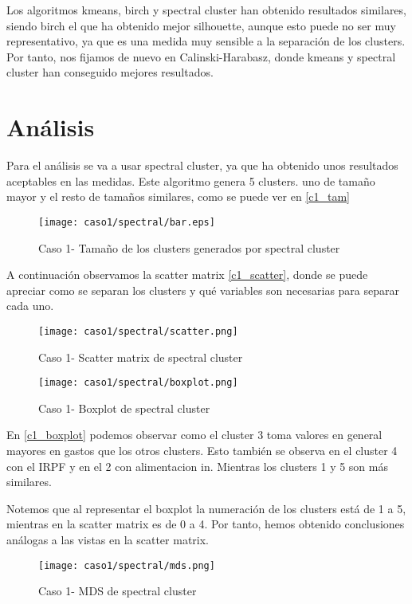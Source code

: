 Los algoritmos kmeans, birch y spectral cluster han obtenido resultados similares, siendo birch el que ha obtenido mejor silhouette, aunque esto puede no ser muy representativo, ya que es una medida muy sensible a la separación de los clusters. Por tanto, nos fijamos de nuevo en Calinski-Harabasz, donde kmeans y spectral cluster han conseguido mejores resultados.


\section{Análisis}


Para el análisis se va a usar spectral cluster, ya que ha obtenido unos resultados aceptables en las medidas. Este algoritmo genera 5 clusters. uno de tamaño mayor y el resto de tamaños similares, como se puede ver en \eqref{c1_tam}

\begin{figure}[H]
\caption{Caso 1- Tamaño de los clusters generados por spectral cluster}
\label{c1_tam}
\texttt{[image: caso1/spectral/bar.eps]}
\end{figure}

A continuación observamos la scatter matrix \eqref{c1_scatter}, donde se puede apreciar como se separan los clusters y qué variables son necesarias para separar cada uno.

\begin{figure}[H]
\caption{Caso 1- Scatter matrix de spectral cluster}
\label{c1_scatter}
\texttt{[image: caso1/spectral/scatter.png]}
\end{figure}


\begin{figure}[H]
\caption{Caso 1- Boxplot de spectral cluster}
\label{c1_boxplot}
\texttt{[image: caso1/spectral/boxplot.png]}
\end{figure}

En \eqref{c1_boxplot} podemos observar como el cluster 3 toma valores en general mayores en gastos que los otros clusters. Esto también se observa en el cluster 4 con el IRPF y en el 2 con alimentacion in. Mientras los clusters 1 y 5 son más similares.

Notemos que al representar el boxplot la numeración de los clusters está de 1 a 5, mientras en la scatter matrix es de 0 a 4. Por tanto, hemos obtenido conclusiones análogas a las vistas en la scatter matrix.

\begin{figure}[H]
\caption{Caso 1- MDS de spectral cluster}
\label{c1_mds}
\texttt{[image: caso1/spectral/mds.png]}
\end{figure}

